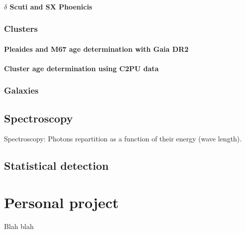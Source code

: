 \documentclass[a4paper]{report}
\begin{document}
\subsubsection{$\delta$ Scuti and SX Phoenicis}

\subsection{Clusters}
\subsubsection{Pleaides and M67 age determination with Gaia DR2}
\subsubsection{Cluster age determination using C2PU data}
\subsection{Galaxies}

\section{Spectroscopy}
Spectroscopy: Photons repartition as a function of their energy (wave length).
\section{Statistical detection}
\chapter{Personal project}


Blah blah 
\end{document}

